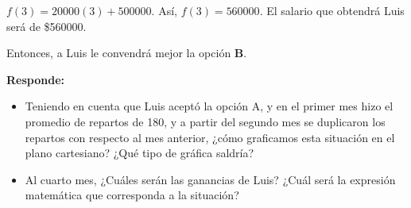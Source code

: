 \documentclass[12pt,a4paper]{article}
\begin{document}
$f(3) = 20000(3) + 500000$. Así, $f(3) = 560000$. El salario que obtendrá Luis será de \$560000.

Entonces, a Luis le convendrá mejor la opción \textbf{B}.

\vspace{0.5cm}

\textbf{Responde:}
\begin{itemize}
\item Teniendo en cuenta que Luis aceptó la opción A, y en el primer mes hizo el promedio de repartos de 180, y a partir del segundo mes se duplicaron los repartos con respecto al mes anterior, ¿cómo graficamos esta situación en el plano cartesiano? ¿Qué tipo de gráfica saldría?
\item Al cuarto mes, ¿Cuáles serán las ganancias de Luis? ¿Cuál será la expresión matemática que corresponda a la situación?
\end{itemize}

\vspace{5mm}

\end{document}
